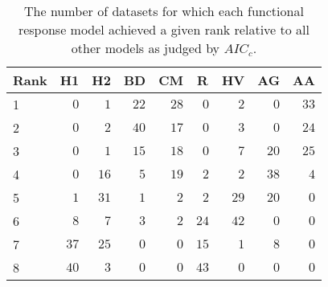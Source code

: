 \begin{table}[!tbp]
\caption{The number of datasets for which each functional response model achieved a given rank relative to all other models as judged by $AIC_c$.\label{table:AICc_rankings}} 
\begin{center}
\begin{tabular}{lrrrrrrrr}
\hline\hline
\multicolumn{1}{l}{Rank}&\multicolumn{1}{c}{H1}&\multicolumn{1}{c}{H2}&\multicolumn{1}{c}{BD}&\multicolumn{1}{c}{CM}&\multicolumn{1}{c}{R}&\multicolumn{1}{c}{HV}&\multicolumn{1}{c}{AG}&\multicolumn{1}{c}{AA}\tabularnewline
\hline
1&$ 0$&$ 1$&$22$&$28$&$ 0$&$ 2$&$ 0$&$33$\tabularnewline
2&$ 0$&$ 2$&$40$&$17$&$ 0$&$ 3$&$ 0$&$24$\tabularnewline
3&$ 0$&$ 1$&$15$&$18$&$ 0$&$ 7$&$20$&$25$\tabularnewline
4&$ 0$&$16$&$ 5$&$19$&$ 2$&$ 2$&$38$&$ 4$\tabularnewline
5&$ 1$&$31$&$ 1$&$ 2$&$ 2$&$29$&$20$&$ 0$\tabularnewline
6&$ 8$&$ 7$&$ 3$&$ 2$&$24$&$42$&$ 0$&$ 0$\tabularnewline
7&$37$&$25$&$ 0$&$ 0$&$15$&$ 1$&$ 8$&$ 0$\tabularnewline
8&$40$&$ 3$&$ 0$&$ 0$&$43$&$ 0$&$ 0$&$ 0$\tabularnewline
\hline
\end{tabular}\end{center}
\end{table}
